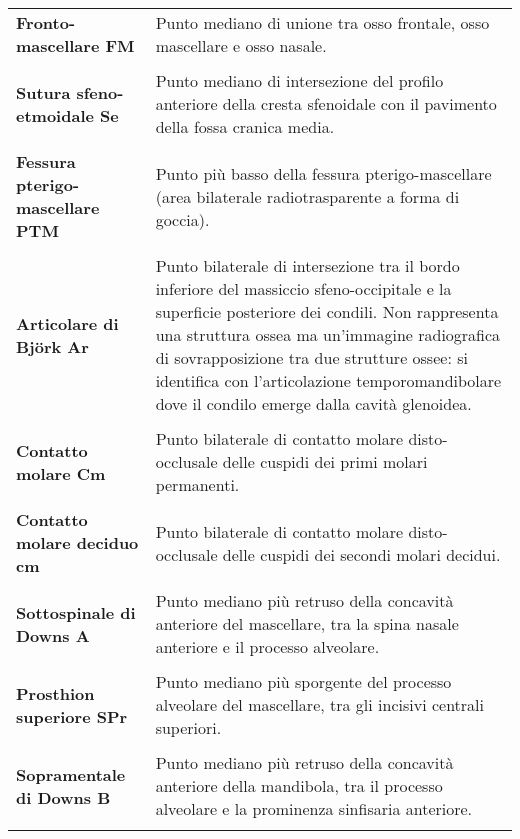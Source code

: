 \begin{longtable}{>{\bfseries}p{5cm}X}
Fronto-mascellare \newline FM & Punto mediano di unione tra osso frontale, osso mascellare e osso nasale.\\\\
Sutura sfeno-etmoidale \newline Se & Punto mediano di intersezione del profilo anteriore della cresta sfenoidale con il pavimento della fossa cranica media.\\\\
Fessura pterigo-mascellare \newline PTM & Punto più basso della fessura pterigo-mascellare (area bilaterale radiotrasparente a forma di goccia).\\\\
Articolare di Björk \newline Ar & Punto bilaterale di intersezione tra il bordo inferiore del massiccio sfeno-occipitale e la superficie posteriore dei condili. Non rappresenta una struttura ossea ma un'immagine radiografica di sovrapposizione tra due strutture ossee: si identifica con l'articolazione temporomandibolare dove il condilo emerge dalla cavità glenoidea.\\\\
Contatto molare \newline Cm & Punto bilaterale di contatto molare disto-occlusale delle cuspidi dei primi molari permanenti.\\\\
Contatto molare deciduo \newline cm & Punto bilaterale di contatto molare disto-occlusale delle cuspidi dei secondi molari decidui.\\\\
Sottospinale di Downs \newline A & Punto mediano più retruso della concavità anteriore del mascellare, tra la spina nasale anteriore e il processo alveolare.\\\\
Prosthion superiore \newline SPr & Punto mediano più sporgente del processo alveolare del mascellare, tra gli incisivi centrali superiori.\\\\
Sopramentale di Downs \newline B & Punto mediano più retruso della concavità anteriore della mandibola, tra il processo alveolare e la prominenza sinfisaria anteriore.\\\\

\end{longtable}
